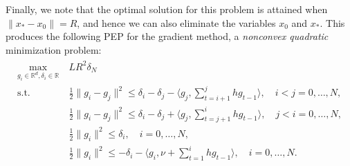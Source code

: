 \documentclass[12pt]{article}
\numberwithin{equation}{section}
\theoremstyle{definition}
\theoremstyle{remark}
\begin{document}
Finally, we note that the optimal solution for this problem is attained when
$\|x_\ast-x_0\|=R$, and hence we can also eliminate the variables $x_0$ and $x_\ast$. This
produces the following PEP for the gradient method, a {\em nonconvex quadratic} minimization
problem:
\begin{align*}
    \begin{aligned}
    \max_{g_i \in\mathbb{R}^d,\delta_i \in\mathbb{R}}\ & LR^2 \delta_N \\
    \text{s.t. }
                        & \frac{1}{2} \| g_i - g_j \| ^2 \leq \delta_i - \delta_j - \langle g_j, \sum_{t=i+1}^{j} h g_{t-1} \rangle,\quad i<j=0,\dots,N, \\
                        & \frac{1}{2} \| g_i - g_j \| ^2 \leq \delta_i - \delta_j + \langle g_j, \sum_{t=j+1}^{i} h g_{t-1} \rangle,\quad j<i=0,\dots,N, \\
                        & \frac{1}{2} \| g_i \| ^2 \leq \delta_i,\quad                                                                                                  i=0,\dots,N, \\
                        & \frac{1}{2} \| g_i \| ^2 \leq - \delta_i - \langle g_i, \nu + \sum_{t=1}^{i} h g_{t-1} \rangle,\quad  i=0,\dots,N. \\
    \end{aligned}
\end{align*}
\end{document}
